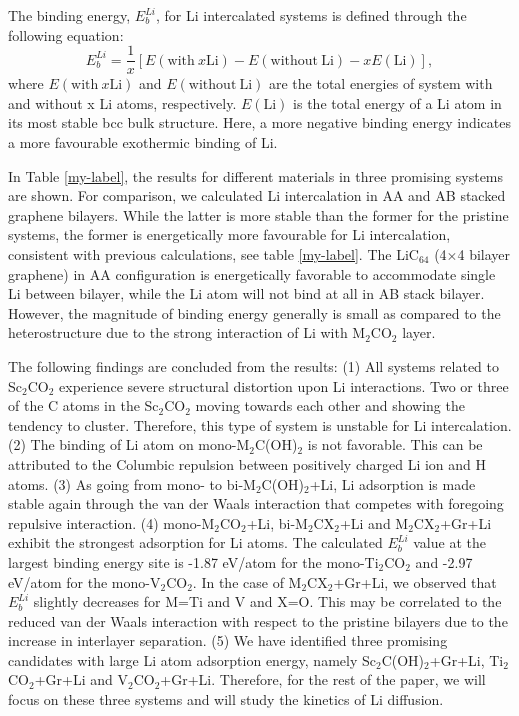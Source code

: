 The binding energy, $E_{b}^{Li}$, for Li intercalated systems is defined through the following equation:
\begin{equation}
E_{b}^{Li}=\frac{1}{x}[E(\mathrm{with~}x\mathrm{Li})-E(\mathrm{without~Li})-xE(\mathrm{Li})],
\end{equation}
where $E(\mathrm{with~}x\mathrm{Li})$ and $E(\mathrm{without~Li})$ are the total energies of system with and without x Li atoms, respectively. $E(\mathrm{Li})$ is the total energy of a Li atom in its most stable bcc bulk structure. Here, a more negative binding energy indicates a more favourable exothermic binding of Li. 

In Table \ref{my-label}, the results for different materials in three promising systems are shown. For comparison, we calculated Li intercalation in AA and AB stacked graphene bilayers. While the latter is more stable than the former for the pristine systems, the former is energetically more favourable for Li intercalation, consistent with previous calculations\cite{PhysRevB.93.245438}, see table \ref{my-label}.  The LiC$_{64}$ (4$\times$4 bilayer graphene) in AA configuration is energetically favorable to accommodate single Li between bilayer, while the Li atom will not bind at all in AB stack bilayer. However, the magnitude of binding energy generally is small as compared to the heterostructure due to the strong interaction of Li with M$_2$CO$_2$ layer.


The following findings are concluded from the results: 
(1) All systems related to Sc$_2$CO$_2$ experience severe structural distortion upon Li interactions. Two or three of the C atoms in the Sc$_2$CO$_2$ moving towards each other and showing the tendency to cluster. Therefore, this type of system is unstable for Li intercalation. 
(2) The binding of Li atom on mono-M$_2$C(OH)$_2$ is not favorable. This can be attributed to the Columbic repulsion between positively charged Li ion and H atoms. 
(3) As going from mono- to bi-M$_2$C(OH)$_2$+Li, Li adsorption is made stable again through the van der Waals interaction that competes with foregoing repulsive interaction.  
(4) mono-M$_2$CO$_2$+Li,  bi-M$_2$CX$_2$+Li and M$_2$CX$_2$+Gr+Li exhibit the strongest adsorption for Li atoms. The calculated $E_{b}^{Li}$ value at the largest binding energy site is -1.87 eV/atom for the mono-Ti$_2$CO$_2$ and -2.97 eV/atom for the mono-V$_2$CO$_2$. In the case of M$_2$CX$_2$+Gr+Li, we observed that $E_{b}^{Li}$ slightly decreases for M=Ti and V and X=O.  This may be correlated to the reduced van der Waals interaction with respect to the pristine bilayers due to the increase in interlayer separation.  
(5) We have identified three promising candidates with large Li atom adsorption energy, namely Sc$_2$C(OH)$_2$+Gr+Li, Ti$_2$CO$_2$+Gr+Li and V$_2$CO$_2$+Gr+Li. Therefore, for the rest of the paper, we will focus on these three systems and will study the kinetics of Li diffusion. 

